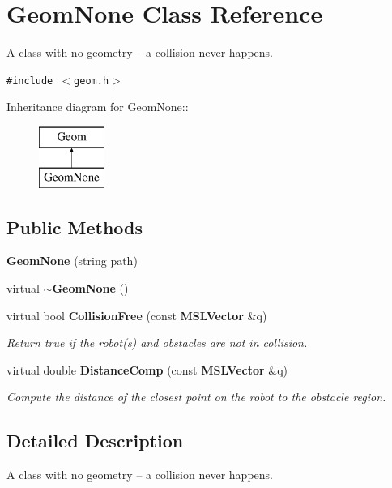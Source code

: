 \section{Geom\-None  Class Reference}
\label{classGeomNone}
A class with no geometry -- a collision never happens. 


{\tt \#include $<$geom.h$>$}

Inheritance diagram for Geom\-None::\begin{figure}[H]
\begin{center}
\leavevmode
\includegraphics[height=2cm]{classGeomNone}
\end{center}
\end{figure}
\subsection*{Public Methods}
\begin{CompactItemize}
\item 
{\bf Geom\-None} (string path)
\item 
virtual {\bf $\sim$Geom\-None} ()
\item 
virtual bool {\bf Collision\-Free} (const {\bf MSLVector} \&q)
\begin{CompactList}\small\item\em Return true if the robot(s) and obstacles are not in collision.\item\end{CompactList}\item 
virtual double {\bf Distance\-Comp} (const {\bf MSLVector} \&q)
\begin{CompactList}\small\item\em Compute the distance of the closest point on the robot to the obstacle region.\item\end{CompactList}\end{CompactItemize}


\subsection{Detailed Description}
A class with no geometry -- a collision never happens.



